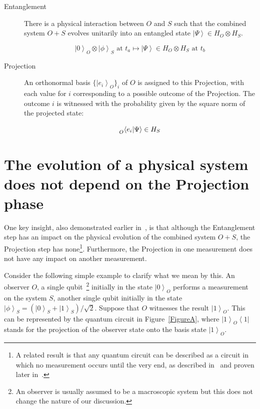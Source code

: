 \documentclass[11pt,amsmath,amssymb,latexsym,a4paper]{article}
\newcommand{\ket}[1]{\left|{#1}\right>}
\newcommand{\ketBasis}[2]{\left|{#1}\right>_{#2}}
\newcommand{\ketbraBasis}[3]{\left|{#1}\right>_{#3}\left<{#2}\right|}
\newcommand{\braketBasisLeft}[3]{\prescript{}{#3}{\left<{#1}|{#2}\right>}}
\begin{document}
\begin{description}
\item[Entanglement] There is a physical interaction between $O$ and $S$ such that the combined system $O+S$ evolves unitarily into an entangled state $\ket{\Psi}\in H_O\otimes H_S$.

\begin{equation} 
\ketBasis{0}{O} \otimes \ketBasis{\phi}{S} \textrm{ at } t_a \mapsto \ket{\Psi}\in H_O\otimes H_S \textrm{ at } t_b
\end{equation} 

\item[Projection] An orthonormal basis $\{\ketBasis{e_i}{O}\}_i$ of $O$ is assigned to this Projection, with each value for $i$ corresponding to a possible outcome of the Projection. The outcome $i$ is witnessed with the probability given by the square norm of the projected state:

\begin{equation} 
\braketBasisLeft{e_i}{\Psi}{O} \in H_S
\end{equation} 

\end{description}

\section{The evolution of a physical system does not depend on the Projection phase}

One key insight, also demonstrated earlier in~\cite{Inamori}, is that although the Entanglement step has an impact on the physical evolution of the combined system $O+S$, the Projection step has none\footnote{A related result is that any quantum circuit can be described as a circuit in which no measurement occurs until the very end, as described in~\cite{Nielsen} and proven later in~\cite{Gurevich}.}.  Furthermore, the Projection in one measurement does not have any impact on another measurement.


Consider the following simple example to clarify what we mean by this. An observer $O$, a single qubit~\footnote{An observer is usually assumed to be a macroscopic system but this does not change the nature of our discussion.} initially in the state $\ketBasis{0}{O}$ performs a measurement on the system $S$, another single qubit initially in the state $\ketBasis{\phi}{S}=(\ketBasis{0}{S}+\ketBasis{1}{S})/\sqrt{2}$.  Suppose that $O$ witnesses the result $\ketBasis{1}{O}$. This can be represented by the quantum circuit in Figure~\ref{FigureA}, where $\ketbraBasis{1}{1}{O}$ stands for the projection of the observer state onto the basis state $\ketBasis{1}{O}$. 
\end{document}
